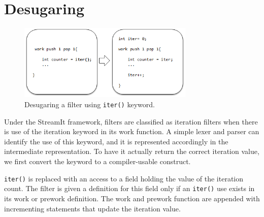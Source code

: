 \section{Desugaring}

%
%
%
%
%
%
%
%
%
%


\begin{figure}[t!]
\centering
\includegraphics[width=3.3in]{figures/desugaring.png}
\caption{Desugaring a filter using \texttt{iter()} keyword.\protect\label{fig:desugar}}
\end{figure}


Under the StreamIt framework, filters are classified as iteration filters when there is use of the iteration keyword in its work function.  A simple lexer and parser can identify the use of this keyword, and it is represented accordingly in the intermediate representation.  To have it actually return the correct iteration value, we first convert the keyword to a compiler-usable construct.

{\tt iter()} is replaced with an access to a field holding the value of the iteration count.  The filter is given a definition for this field only if an {\tt iter()} use exists in its work or prework definition.  The work and prework function are appended with incrementing statements that update the iteration value.

